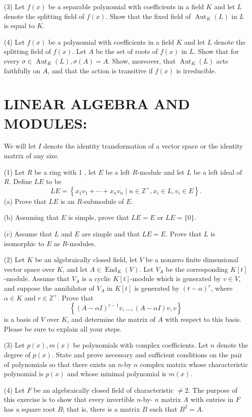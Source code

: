 \documentclass[10pt]{article}
\begin{document}
(3) Let $f(x)$ be a separable polynomial with coefficients in a field $K$ and let $L$ denote the splitting field of $f(x)$. Show that the fixed field of $\operatorname{Aut}_{K}(L)$ in $L$ is equal to $K$.

(4) Let $f(x)$ be a polynomial with coefficients in a field $K$ and let $L$ denote the splitting field of $f(x)$. Let $A$ be the set of roots of $f(x)$ in $L$. Show that for every $\sigma \in \operatorname{Aut}_{K}(L), \sigma(A)=A$. Show, moreover, that $\operatorname{Aut}_{K}(L)$ acts faithfully on $A$, and that the action is transitive if $f(x)$ is irreducible.

\section{LINEAR ALGEBRA AND MODULES:}
We will let $I$ denote the identity transformation of a vector space or the identity matrix of any size.

(1) Let $R$ be a ring with 1 , let $E$ be a left $R$-module and let $L$ be a left ideal of $R$. Define $L E$ to be
$$
L E=\left\{x_{1} v_{1}+\cdots+x_{n} v_{n} \mid n \in \mathbb{Z}^{+}, x_{i} \in L, v_{i} \in E\right\} .
$$
(a) Prove that $L E$ is an $R$-submodule of $E$.

(b) Assuming that $E$ is simple, prove that $L E=E$ or $L E=\{0\}$.

(c) Assume that $L$ and $E$ are simple and that $L E=E$. Prove that $L$ is isomorphic to $E$ as $R$-modules.

(2) Let $K$ be an algebraically closed field, let $V$ be a nonzero finite dimensional vector space over $K$, and let $A \in \operatorname{End}_{K}(V)$. Let $V_{A}$ be the corresponding $K[t]$-module. Assume that $V_{A}$ is a cyclic $K[t]$-module which is generated by $v \in V$, and suppose the annihilator of $V_{A}$ in $K[t]$ is generated by $(t-\alpha)^{r}$, where $\alpha \in K$ and $r \in \mathbb{Z}^{+}$. Prove that
$$
\left\{(A-\alpha I)^{r-1} v, \ldots,(A-\alpha I) v, v\right\}
$$
is a basis of $V$ over $K$, and determine the matrix of $A$ with respect to this basis. Please be sure to explain all your steps.

(3) Let $p(x), m(x)$ be polynomials with complex coefficients. Let $n$ denote the degree of $p(x)$. State and prove necessary and sufficient conditions on the pair of polynomials so that there exists an $n$-by $n$ complex matrix whose characteristic polynomial is $p(x)$ and whose minimal polynomial is $m(x)$.

(4) Let $F$ be an algebraically closed field of characteristic $\neq 2$. The purpose of this exercise is to show that every invertible $n$-by- $n$ matrix $A$ with entries in $F$ has a square root $B$; that is, there is a matrix $B$ such that $B^{2}=A$.
\end{document}
